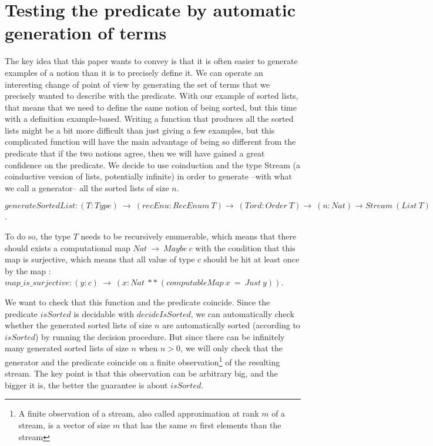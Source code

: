 \section{Testing the predicate by automatic generation of terms}

\label{sect:testingInside}

The key idea that this paper wants to convey is that it is often easier to generate examples of a notion than it is to precisely define it. We can operate an interesting change of point of view by generating the set of terms that we precisely wanted to describe with the predicate. With our example of sorted lists, that means that we need to define the same notion of being sorted, but this time with a definition example-based. Writing a function that produces all the sorted lists might be a bit more difficult than just giving a few examples, but this complicated function will have the main advantage of being so different from the predicate that if the two notions agree, then we will have gained a great confidence on the predicate. We decide to use coinduction and the type Stream (a coinductive version of lists, potentially infinite) in order to generate --with what we call a generator-- all the sorted lists of size $n$.

$generateSortedList : (T:Type)\ \rightarrow\ (recEnu:RecEnum\ T) \rightarrow\ (Tord : Order\ T) \rightarrow\ (n:Nat) \rightarrow Stream\ (List\ T)$.

To do so, the type $T$ needs to be recursively enumerable, which means that there should exists a computational map $Nat\ \rightarrow\ Maybe\ c$ with the condition that this map is surjective, which means that all value of type $c$ should be hit at least once by the map : $map\_is\_surjective : (y:c)\ \rightarrow\ (x:Nat\ **\ (computableMap\ x\ =\ Just\ y))$.

We want to check that this function and the predicate coincide. Since the predicate $isSorted$ is decidable with $decideIsSorted$, we can automatically check whether the generated sorted lists of size $n$ are automatically sorted (according to $isSorted$) by running the decision procedure. But since there can be infinitely many generated sorted lists of size $n$ when $n > 0$, we will only check that the generator and the predicate coincide on a finite observation\footnote{A finite observation of a stream, also called approximation at rank $m$ of a stream, is a vector of size $m$ that has the same $m$ first elements than the stream} of the resulting stream. The key point is that this observation can be arbitrary big, and the bigger it is, the better the guarantee is about $isSorted$.


